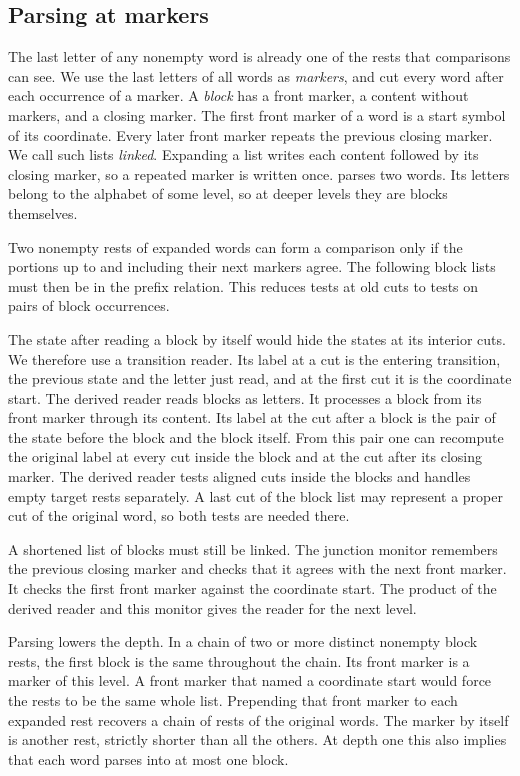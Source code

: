 \subsection{Parsing at markers}
\label{sec:parsing}

The last letter of any nonempty word is already one of the rests that
comparisons can see. We use the last letters of all words as
\emph{markers}, and cut every word after each occurrence of a marker.
A \emph{block} has a front marker, a content without markers, and a
closing marker. The first front marker of a word is a start symbol of its
coordinate. Every later front marker repeats the previous closing marker.
We call such lists \emph{linked}. Expanding a list writes each content
followed by its closing marker, so a repeated marker is written once.
 parses two words. Its letters belong to the alphabet of
some level, so at deeper levels they are blocks themselves.



Two nonempty rests of expanded words can form a comparison only if
the portions up to and including their next markers agree. The following
block lists must then be in the prefix relation. This reduces tests at
old cuts to tests on pairs of block occurrences.

The state after reading a block by itself would hide the states at
its interior cuts. We therefore use a transition reader. Its label at a
cut is the entering transition, the previous state and the letter just
read, and at the first cut it is the coordinate start. The derived reader
reads blocks as letters. It processes a block from its front marker
through its content. Its label at the cut after a block is the pair of the
state before the block and the block itself. From this pair one can
recompute the original label at every cut inside the block and at the cut
after its closing marker. The derived reader tests aligned cuts inside the
blocks and handles empty target rests separately. A last cut of the block
list may represent a proper cut of the original word, so both tests are
needed there.

A shortened list of blocks must still be linked. The junction monitor
remembers the previous closing marker and checks that it agrees with
the next front marker. It checks the first front marker against the
coordinate start. The product of the derived reader and this monitor
gives the reader for the next level.

Parsing lowers the depth. In a chain of two or more distinct nonempty
block rests, the first block is the same throughout the chain. Its
front marker is a marker of this level. A front marker that named a
coordinate start would force the rests to be the same whole list.
Prepending that front marker to each expanded rest recovers a chain
of rests of the original words. The marker by itself is another rest,
strictly shorter than all the others. At depth one this also implies
that each word parses into at most one block.

